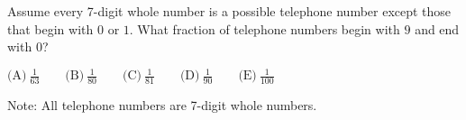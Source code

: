 

Assume every 7-digit whole number is a possible telephone number except those that begin with $0$ or $1$. What fraction of telephone numbers begin with $9$ and end with $0$?

$\text{(A)}\ \frac{1}{63} \qquad \text{(B)}\ \frac{1}{80} \qquad \text{(C)}\ \frac{1}{81} \qquad \text{(D)}\ \frac{1}{90} \qquad \text{(E)}\ \frac{1}{100}$

Note: All telephone numbers are 7-digit whole numbers.
